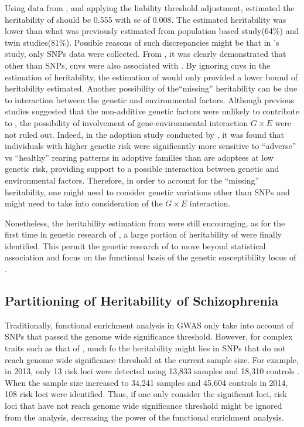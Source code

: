 \documentclass[12pt]{book}
\newcommand*{\glng}{\glsentrylong}
\begin{document}
	
	Using data from \citet{Ripke2014}, and applying the liability threshold adjustment, \citet{Bulik-Sullivan2015} estimated the heritability of \glng{scz} should be 0.555 with \gls{se} of 0.008.
	The estimated heritability was lower than what was previously estimated from population based study(64\%\citep{Lichtenstein2009}) and twin studies(81\%\citep{Sullivan2003}).
	Possible reasons of such discrepancies might be that in \citet{Ripke2014}'s study, only \glspl{SNP} data were collected. 
	From \citet{Szatkiewicz2014}, it was clearly demonstrated that other than \glspl{SNP}, \glspl{cnv} were also associated with \glng{scz}.
	By ignoring \glspl{cnv} in the estimation of heritability, the estimation of \citet{Bulik-Sullivan2015} would only provided a lower bound of heritability estimated.
	Another possibility of the``missing'' heritability can be due to interaction between the genetic and environmental factors. 
	Although previous studies\citep{Gottesman01071967} suggested that the non-additive genetic factors were unlikely to contribute to \glng{scz}, the possibility of involvement of gene-environmental interaction $G\times E$ were not ruled out.
	Indeed, in the adoption study conducted by \citet{Tienari2004}, it was found that individuals with higher genetic risk were significantly more sensitive to ``adverse'' vs ``healthy'' rearing patterns in adoptive families than are adoptees at low genetic risk\citep{Tienari2004}, providing support to a possible interaction between genetic and environmental factors.
	Therefore, in order to account for the ``missing'' heritability, one might need to consider genetic variations other than \glspl{SNP} and might need to take into consideration of the $G\times E$ interaction.
	
	Nonetheless, the heritability estimation from \citet{Ripke2014} were still encouraging, as for the first time in genetic research of \glng{scz}, a large portion of heritability of \glng{scz} were finally identified.
	This permit the genetic research of \glng{scz} to move beyond statistical association and focus on the functional basis of the genetic susceptibility locus of \glng{scz}.
	
	\subsection{Partitioning of Heritability of Schizophrenia}
	Traditionally, functional enrichment analysis in \gls{GWAS} only take into account of \glspl{SNP} that passed the genome wide significance threshold. 
	However, for complex traits such as that of \glng{scz}, much fo the heritability might lies in \glspl{SNP} that do not reach genome wide significance threshold at the current sample size.
	For example, in 2013, only 13 risk loci were detected using 13,833 \glng{scz} samples and 18,310 controls \citep{Ripke2013}. 
	When the sample size increased to 34,241 \glng{scz} samples and 45,604 controls in 2014, 108 risk loci were identified\citep{Ripke2014}. 
	Thus, if one only consider the significant loci, risk loci that have not reach genome wide significance threshold might be ignored from the analysis, decreasing the power of the functional enrichment analysis.
	
\end{document}
